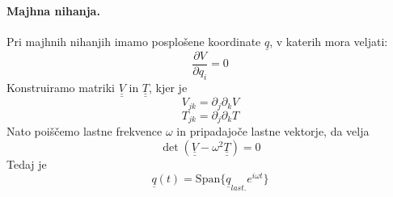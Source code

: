 \documentclass[a4paper]{article}
\newcommand{\pd}[2]{\frac{\partial {#1}}{\partial {#2}}}
\newcommand{\duline}[1]{\underline{\underline{#1}}}
\begin{document}
\paragraph{Majhna nihanja.} Pri majhnih nihanjih imamo posplošene koordinate $\underline{q}$, v katerih mora veljati:
$$\pd{V}{q_i} = 0$$
Konstruiramo matriki $\duline{V}$ in $\duline{T}$, kjer je
$$V_{jk} = \partial_j\partial_k V$$
$$T_{jk} = \partial_j\partial_k T$$
Nato poiščemo lastne frekvence $\omega$ in pripadajoče lastne vektorje, da velja $$\det(\duline{V} - \omega^2\duline{T}) = 0$$
Tedaj je $$\underline{q}(t) = \mathrm{Span}\{\underline{q}_{last.} e^{i\omega t}\}$$
\end{document}
